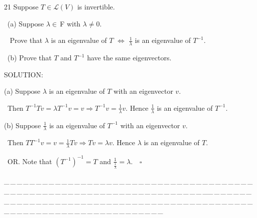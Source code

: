 \documentclass[a4paper, 11pt, UTF8]{article}
\def\Lm{\mathcal{L}}
\def\Fbf{$\,{\timesbf F}\,$}
\begin{document}
\begin{large}
{\timesbf\Large 21} {\timessl\Large 
Suppose $T\in\Lm(V)$ is invertible.}\par\quad\,
(a) {\timessl\Large Suppose $\lambda\in\Fbf\,$with $\lambda\neq 0$.}\par\qquad\,\,\,
{\timessl\Large Prove that $\lambda$ is an eigenvalue of $T$ $\Longleftrightarrow$ $\frac{1}{\lambda}$ is an eigenvalue of $T^{-1}$.}\par\quad\,
(b) {\timessl\Large Prove that $T$ and $T^{-1}$ have the same eigenvectors.
}\par
{\timesbf S\footnotesize{OLUTION:}}\par\quad
(a) Suppose $\lambda$ is an eigenvalue of $T$ with an eigenvector $v.$\par\qquad\,
Then $T^{-1}Tv=\lambda T^{-1}v=v\Rightarrow T^{-1}v=\frac{1}{\lambda}v.$ Hence $\frac{1}{\lambda}$ is an eigenvalue of $T^{-1}.$\par\quad
(b) Suppose $\frac{1}{\lambda}$ is an eigenvalue of $T^{-1}$ with an eigenvector $v.$\par\qquad\,
Then $TT^{-1}v=v=\frac{1}{\lambda}Tv\Rightarrow Tv=\lambda v.$ Hence $\lambda$ is an eigenvalue of $T.$\par\qquad\,
O{\small R.} Note that $(T^{-1})^{-1}=T$ and $\frac{1}{\frac{1}{\lambda}}=\lambda.\quad\square$\par
{\tiny \_\,\_\,\_\,\_\,\_\,\_\,\_\,\_\,\_\,\_\,\_\,\_\,\_\,\_\,\_\,\_\,\_\,\_\,\_\,\_\,\_\,\_\,\_\,\_\,\_\,\_\,\_\,\_\,\_\,\_\,\_\,\_\,\_\,\_\,\_\,\_\,\_\,\_\,\_\,\_\,\_\,\_\,\_\,\_\,\_\,\_\,\_\,\_\,\_\,\_\,\_\,\_\,\_\,\_\,\_\,\_\,\_\,\_\,\_\,\_\,\_\,\_\,\_\,\_\,\_\,\_\,\_\,\_\,\_\,\_\,\_\_\,\_\,\_\,\_\,\_\,\_\,\_\,\_\,\_\,\_\,\_\,\_\,\_\,\_\,\_\,\_\,\_\,\_\,\_\,\_\,\_\,\_\,\_\,\_\,\_\,\_\,\_\,\_\,\_\,\_\,\_\,\_\,\_\,\_\,\_\,\_\,\_\,\_\,\_\,\_\,\_\,\_\,\_\,\_\,\_\,\_\,\_\,\_\,\_\,\_\,\_\,\_\,\_\,\_\,\_\,\_\,\_\,\_\,\_\,\_\,\_\,\_\,\_\,\_\,\_\,\_\,\_\,\_\,\_\,\_\,\_}{\tiny\,\par}


\end{large}
\end{document}
